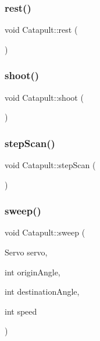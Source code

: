 \mbox{\label{class_catapult_ae9673fabd4375317bebb257b64db4d84}} 
\subsubsection{\texorpdfstring{rest()}{rest()}}
{\footnotesize\ttfamily void Catapult\+::rest (\begin{DoxyParamCaption}{ }\end{DoxyParamCaption})}

\mbox{\label{class_catapult_a4a2ea0d327a135f6a5a2283436e1a99f}} 
\subsubsection{\texorpdfstring{shoot()}{shoot()}}
{\footnotesize\ttfamily void Catapult\+::shoot (\begin{DoxyParamCaption}{ }\end{DoxyParamCaption})}

\mbox{\label{class_catapult_a739b4bb52e2a8529518226cd7e4bf8b1}} 
\subsubsection{\texorpdfstring{step\+Scan()}{stepScan()}}
{\footnotesize\ttfamily void Catapult\+::step\+Scan (\begin{DoxyParamCaption}{ }\end{DoxyParamCaption})}

\mbox{\label{class_catapult_ae6274ce7039929a6c9468aa9d5d763ef}} 
\subsubsection{\texorpdfstring{sweep()}{sweep()}}
{\footnotesize\ttfamily void Catapult\+::sweep (\begin{DoxyParamCaption}\item[{Servo}]{servo,  }\item[{int}]{origin\+Angle,  }\item[{int}]{destination\+Angle,  }\item[{int}]{speed }\end{DoxyParamCaption})}



